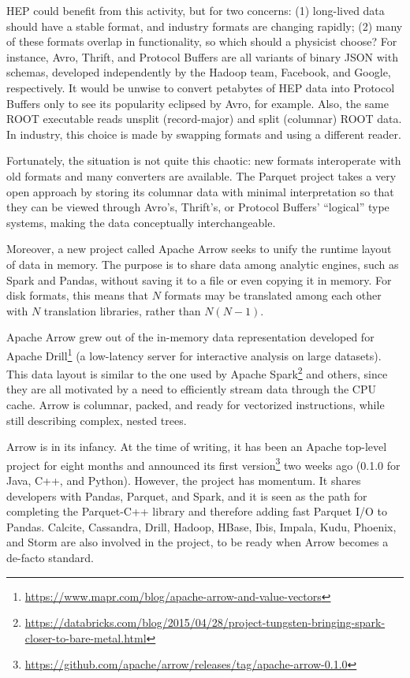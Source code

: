 \documentclass{article}
\begin{document}
HEP could benefit from this activity, but for two concerns: (1) long-lived data should have a stable format, and industry formats are changing rapidly; (2) many of these formats overlap in functionality, so which should a physicist choose? For instance, Avro, Thrift, and Protocol Buffers are all variants of binary JSON with schemas, developed independently by the Hadoop team, Facebook, and Google, respectively. It would be unwise to convert petabytes of HEP data into Protocol Buffers only to see its popularity eclipsed by Avro, for example. Also, the same ROOT executable reads unsplit (record-major) and split (columnar) ROOT data. In industry, this choice is made by swapping formats and using a different reader.

Fortunately, the situation is not quite this chaotic: new formats interoperate with old formats and many converters are available. The Parquet project takes a very open approach by storing its columnar data with minimal interpretation so that they can be viewed through Avro's, Thrift's, or Protocol Buffers' ``logical'' type systems, making the data conceptually interchangeable.

Moreover, a new project called Apache Arrow seeks to unify the runtime layout of data in memory. The purpose is to share data among analytic engines, such as Spark and Pandas, without saving it to a file or even copying it in memory. For disk formats, this means that $N$ formats may be translated among each other with $N$ translation libraries, rather than $N(N - 1)$.

Apache Arrow grew out of the in-memory data representation developed for Apache Drill\footnote{\url{https://www.mapr.com/blog/apache-arrow-and-value-vectors}} (a low-latency server for interactive analysis on large datasets). This data layout is similar to the one used by Apache Spark\footnote{\url{https://databricks.com/blog/2015/04/28/project-tungsten-bringing-spark-closer-to-bare-metal.html}} and others, since they are all motivated by a need to efficiently stream data through the CPU cache. Arrow is columnar, packed, and ready for vectorized instructions, while still describing complex, nested trees.

Arrow is in its infancy. At the time of writing, it has been an Apache top-level project for eight months and announced its first version\footnote{\url{https://github.com/apache/arrow/releases/tag/apache-arrow-0.1.0}} two weeks ago (0.1.0 for Java, C++, and Python). However, the project has momentum. It shares developers with Pandas, Parquet, and Spark, and it is seen as the path for completing the Parquet-C++ library and therefore adding fast Parquet I/O to Pandas. Calcite, Cassandra, Drill, Hadoop, HBase, Ibis, Impala, Kudu, Phoenix, and Storm are also involved in the project, to be ready when Arrow becomes a de-facto standard.
\end{document}
